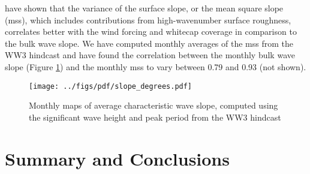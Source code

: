 \cite{schwendeman2015observations} have shown that the variance of the surface slope, or the mean square slope (mss), which includes contributions from high-wavenumber surface roughness, correlates better with the wind forcing and whitecap coverage in comparison to the bulk wave slope. We have computed monthly averages of the mss from the WW3 hindcast and have found the correlation between the monthly bulk wave slope (Figure \ref{slope}) and the monthly mss to vary between 0.79 and 0.93 (not shown).

\begin{figure}[h]
\centering
\texttt{[image: ../figs/pdf/slope\_degrees.pdf]}
\caption{Monthly maps of average characteristic wave slope, computed using the significant wave height and 
peak period from the WW3 hindcast}
\label{slope}
\end{figure}


\section{Summary and Conclusions}

